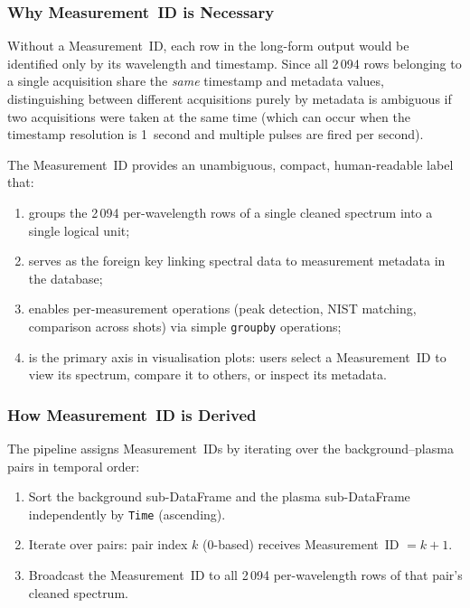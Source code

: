 \documentclass[a4paper,twocolumn,10pt]{article}
\begin{document}
\subsubsection{Why Measurement~ID is Necessary}

Without a Measurement~ID, each row in the long-form output would be
identified only by its wavelength and timestamp.  Since all 2\,094
rows belonging to a single acquisition share the \emph{same}
timestamp and metadata values, distinguishing between different
acquisitions purely by metadata is ambiguous if two acquisitions were
taken at the same time (which can occur when the timestamp resolution
is 1~second and multiple pulses are fired per second).

The Measurement~ID provides an unambiguous, compact, human-readable
label that:
\begin{enumerate}[nosep,leftmargin=*]
  \item groups the 2\,094 per-wavelength rows of a single cleaned
    spectrum into a single logical unit;
  \item serves as the foreign key linking spectral data to measurement
    metadata in the database;
  \item enables per-measurement operations (peak detection, NIST
    matching, comparison across shots) via simple \texttt{groupby}
    operations;
  \item is the primary axis in visualisation plots: users select a
    Measurement~ID to view its spectrum, compare it to others, or
    inspect its metadata.
\end{enumerate}

\subsubsection{How Measurement~ID is Derived}

The pipeline assigns Measurement~IDs by iterating over the
background--plasma pairs in temporal order:

\begin{enumerate}[nosep,leftmargin=*]
  \item Sort the background sub-DataFrame and the plasma
    sub-DataFrame independently by \texttt{Time} (ascending).
  \item Iterate over pairs: pair index $k$ (0-based) receives
    Measurement~ID $= k + 1$.
  \item Broadcast the Measurement~ID to all 2\,094
    per-wavelength rows of that pair's cleaned spectrum.
\end{enumerate}
\end{document}
